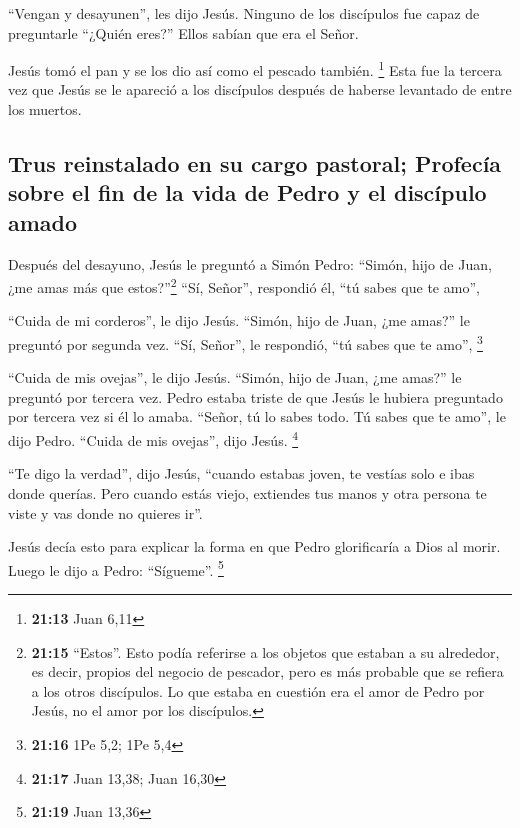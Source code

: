  ``Vengan y desayunen'', les dijo Jesús. Ninguno de los
discípulos fue capaz de preguntarle ``¿Quién eres?'' Ellos sabían que
era el Señor.

 Jesús tomó el pan y se los dio así como el pescado
también. \footnote{\textbf{21:13} Juan 6,11}  Esta fue la
tercera vez que Jesús se le apareció a los discípulos después de haberse
levantado de entre los muertos.

\hypertarget{trus-reinstalado-en-su-cargo-pastoral-profecuxeda-sobre-el-fin-de-la-vida-de-pedro-y-el-discuxedpulo-amado}{%
\subsection{Trus reinstalado en su cargo pastoral; Profecía sobre el fin
de la vida de Pedro y el discípulo
amado}\label{trus-reinstalado-en-su-cargo-pastoral-profecuxeda-sobre-el-fin-de-la-vida-de-pedro-y-el-discuxedpulo-amado}}

 Después del desayuno, Jesús le preguntó a Simón Pedro:
``Simón, hijo de Juan, ¿me amas más que estos?''\footnote{\textbf{21:15}
  ``Estos''. Esto podía referirse a los objetos que estaban a su
  alrededor, es decir, propios del negocio de pescador, pero es más
  probable que se refiera a los otros discípulos. Lo que estaba en
  cuestión era el amor de Pedro por Jesús, no el amor por los
  discípulos.} ``Sí, Señor'', respondió él, ``tú sabes que te amo'',

 ``Cuida de mi corderos'', le dijo Jesús. ``Simón, hijo
de Juan, ¿me amas?'' le preguntó por segunda vez. ``Sí, Señor'', le
respondió, ``tú sabes que te amo'', \footnote{\textbf{21:16} 1Pe 5,2;
  1Pe 5,4}

 ``Cuida de mis ovejas'', le dijo Jesús. ``Simón, hijo de
Juan, ¿me amas?'' le preguntó por tercera vez. Pedro estaba triste de
que Jesús le hubiera preguntado por tercera vez si él lo amaba. ``Señor,
tú lo sabes todo. Tú sabes que te amo'', le dijo Pedro. ``Cuida de mis
ovejas'', dijo Jesús. \footnote{\textbf{21:17} Juan 13,38; Juan 16,30}

 ``Te digo la verdad'', dijo Jesús, ``cuando estabas
joven, te vestías solo e ibas donde querías. Pero cuando estás viejo,
extiendes tus manos y otra persona te viste y vas donde no quieres ir''.

 Jesús decía esto para explicar la forma en que Pedro
glorificaría a Dios al morir. Luego le dijo a Pedro: ``Sígueme''.
\footnote{\textbf{21:19} Juan 13,36}

